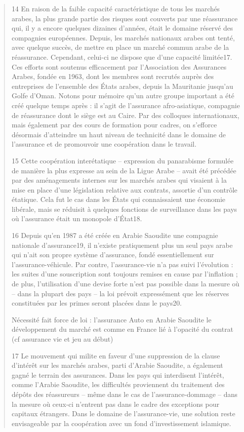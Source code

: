 \begin{quote}
14 En raison de la faible capacité caractéristique de tous les marchés arabes, la plus grande partie des risques sont couverts par une réassurance qui, il y a encore quelques dizaines d’années, était le domaine réservé des compagnies européennes. Depuis, les marchés nationaux arabes ont tenté, avec quelque succès, de mettre en place un marché commun arabe de la réassurance. Cependant, celui-ci ne dispose que d’une capacité limitée17. Ces efforts sont soutenus efficacement par l’Association des Assurances Arabes, fondée en 1963, dont les membres sont recrutés auprès des entreprises de l’ensemble des États arabes, depuis la Mauritanie jusqu’au Golfe d’Oman. Notons pour mémoire qu’un autre groupe important a été créé quelque temps après : il s’agit de l’assurance afro-asiatique, compagnie de réassurance dont le siège est au Caire. Par des colloques internationaux, mais également par des cours de formation pour cadres, on s’efforce désormais d’atteindre un haut niveau de technicité dans le domaine de l’assurance et de promouvoir une coopération dans le travail.
 
15 Cette coopération interétatique – expression du panarabisme formulée de manière la plus expresse au sein de la Ligue Arabe – avait été précédée par des aménagements internes sur les marchés arabes qui visaient à la mise en place d’une législation relative aux contrats, assortie d’un contrôle étatique. Cela fut le cas dans les États qui connaissaient une économie libérale, mais se réduisit à quelques fonctions de surveillance dans les pays où l’assurance était un monopole d’État18.

16 Depuis qu’en 1987 a été créée en Arabie Saoudite une compagnie nationale d’assurance19, il n’existe pratiquement plus un seul pays arabe qui n’ait son propre système d’assurance, fondé essentiellement sur l’assurance-véhicule. Par contre, l’assurance-vie n’a pas suivi l’évolution : les suites d’une souscription sont toujours remises en cause par l’inflation ; de plus, l’utilisation d’une devise forte n’est pas possible dans la mesure où – dans la plupart des pays – la loi prévoit expressément que les réserves constituées par les primes seront placées dans le pays20.

\begin{Synthesis}
Nécessité fait force de loi : l'assurance Auto en Arabie Saoudite
le développement du marché est comme en France lié à l'opacité du contrat (cf assurance vie et jeu au début)
\end{Synthesis}
17 Le mouvement qui milite en faveur d’une suppression de la clause d’intérêt sur les marchés arabes, parti d’Arabie Saoudite, a également gagné le terrain des assurances. Dans les pays qui interdisent l’intérêt, comme l’Arabie Saoudite, les difficultés proviennent du traitement des dépôts des réassureurs – même dans le cas de l’assurance-dommage – dans la mesure où ceux-ci n’entrent pas dans le cadre des exceptions pour capitaux étrangers. Dans le domaine de l’assurance-vie, une solution reste envisageable par la coopération avec un fond d’investissement islamique.


\end{quote}

